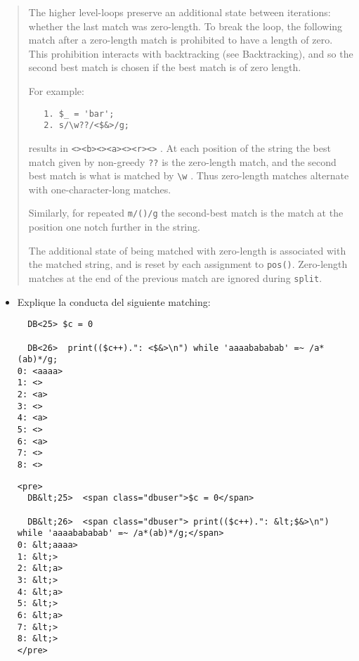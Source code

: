 \begin{it}
\begin{quote}
The higher level-loops preserve an additional state between iterations:
whether the last match was zero-length. To break the loop, the following
match after a zero-length match is prohibited to have a length of
zero. This prohibition interacts with backtracking (see Backtracking), and
so the second best match is chosen if the best match is of zero length.

For example:

\begin{verbatim}
   1. $_ = 'bar';
   2. s/\w??/<$&>/g;
\end{verbatim}

results in \verb|<><b><><a><><r><>| . At each position of the string the best
match given by non-greedy \verb|??| is the zero-length match, and the second
best match is what is matched by \verb|\w| . Thus zero-length matches alternate
with one-character-long matches.

Similarly, for repeated \verb|m/()/g| the second-best match is the match at
the position one notch further in the string.

The additional state of being matched with zero-length is associated with
the matched string, and is reset by each assignment to \verb|pos()|. Zero-length
matches at the end of the previous match are ignored during \verb|split|.
\end{quote}
\end{it}

\begin{exercise}
\begin{itemize}
\item
Explique la conducta del siguiente matching:
\begin{latexonly}
\begin{verbatim}
  DB<25> $c = 0

  DB<26>  print(($c++).": <$&>\n") while 'aaaabababab' =~ /a*(ab)*/g;
0: <aaaa>
1: <>
2: <a>
3: <>
4: <a>
5: <>
6: <a>
7: <>
8: <>
\end{verbatim}
\end{latexonly}
\begin{verbatim}
<pre>
  DB&lt;25>  <span class="dbuser">$c = 0</span>

  DB&lt;26>  <span class="dbuser"> print(($c++).": &lt;$&>\n") while 'aaaabababab' =~ /a*(ab)*/g;</span>
0: &lt;aaaa>
1: &lt;>
2: &lt;a>
3: &lt;>
4: &lt;a>
5: &lt;>
6: &lt;a>
7: &lt;>
8: &lt;>
</pre>
\end{verbatim}
\end{itemize}
\end{exercise}

